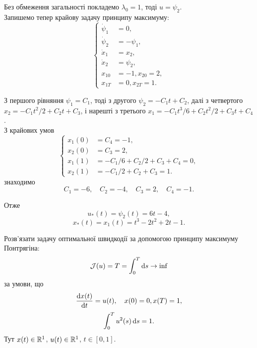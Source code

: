 \begin{solution}
	Без обмеження загальності покладемо $\lambda_0 = 1$, тоді $u = \psi_2$. \\

	Запишемо тепер крайову задачу принципу максимуму: \[ \left\{ \begin{aligned}
		\dot \psi_1 &= 0, \\
		\dot \psi_2 &= - \psi_1, \\
		\dot x_1 &= x_2, \\
		\dot x_2 &= \psi_2, \\
		x_{10} &= -1, x_{20} = 2, \\
		x_{1T} &= 0, x_{2T} = 1.
	\end{aligned} \right. \]

	З першого рівняння $\psi_1 = C_1$, тоді з другого $\psi_2 = - C_1 t + C_2$, далі з четвертого $x_2 = - C_1 t^2 / 2 + C_2 t + C_3$, і нарешті з третього $x_1 = - C_1 t^3 / 6 + C_2 t^2 / 2 + C_3 t + C_4$. \\

	З крайових умов \[ \left\{ \begin{aligned}
		x_1(0) &= C_4 = -1, \\
		x_2(0) &= C_3 = 2, \\
		x_1(1) &= - C_1 / 6 + C_2 / 2 + C_3 + C_4 = 0, \\
		x_2(1) &= - C_1 / 2 + C_2 + C_3 = 1.
	\end{aligned} \right. \] знаходимо \[C_1 = -6, \quad C_2 = -4, \quad C_3 = 2, \quad C_4 = -1. \]

	Отже \[ u_*(t) = \psi_2(t) = 6 t - 4, \] \[ x_*(t) = x_1(t) = t^3 - 2 t^2 + 2 t - 1. \]
\end{solution}

\begin{problem}
	Розв'язати задачу оптимальної швидкодії за допомогою принципу максимуму Понтрягіна: \[ \mathcal{J} (u) = T = \int_0^T \mathop{}\!\mathrm{d} s \to \inf \] за умови, що \[ \frac{\mathop{}\!\mathrm{d} x(t)}{\mathop{}\!\mathrm{d} t} = u (t), \quad x(0) = 0, x(T) = 1, \] \[ \int_0^T u^2(s) \mathop{}\!\mathrm{d} s = 1. \] Тут $x (t) \in \mathbb{R}^1$, $u (t) \in \mathbb{R}^1$, $t \in [0, 1]$.
\end{problem}

